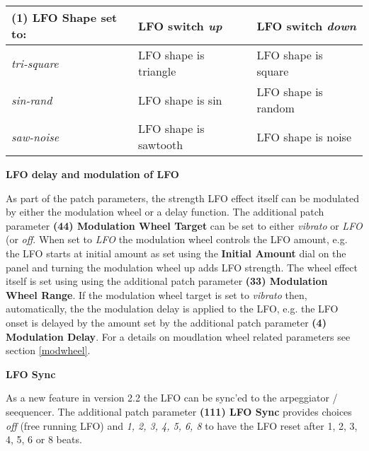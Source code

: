 \begin{tabular}{ |l|l|l|} 
 \hline
  \textbf{(1) LFO Shape} set to: & \textbf{LFO} switch \textit{up} & \textbf{LFO} switch \textit{down} \\
 \hline
 \textit{tri-square} & LFO shape is triangle & LFO shape is square\\
 \hline
 \textit{sin-rand} & LFO shape is sin & LFO shape is random \\
 \hline
 \textit{saw-noise} & LFO shape is sawtooth & LFO shape is noise \\
 \hline
\end{tabular}

\textbf{LFO delay and modulation of LFO}

As part of the patch parameters, the strength LFO effect itself can be modulated by either the modulation wheel or a delay function. The additional patch parameter \textbf{(44) Modulation Wheel Target} can be set to either \textit{vibrato} or \textit{LFO} (or \textit{off}. When set to \textit{LFO} the modulation wheel controls the LFO amount, e.g. the LFO starts at initial amount as set using the \textbf{Initial Amount} dial on the panel and turning the modulation wheel up adds LFO strength. The wheel effect itself is set using using the additional patch parameter \textbf{(33) Modulation Wheel Range}. If the modulation wheel target is set to \textit{vibrato} then, automatically, the the modulation delay is applied to the LFO, e.g. the LFO onset is delayed by the amount set by the additional patch parameter \textbf{(4) Modulation Delay}. For a details on moudlation wheel related parameters see section \ref{modwheel}.

\textbf{LFO Sync}

As a new feature in version 2.2 the LFO can be sync'ed to the arpeggiator / seequencer. The additional patch parameter \textbf{(111) LFO Sync} provides choices \textit{off} (free running LFO) and \textit{1, 2, 3, 4, 5, 6, 8} to have the LFO reset after 1, 2, 3, 4, 5, 6 or 8 beats. 
